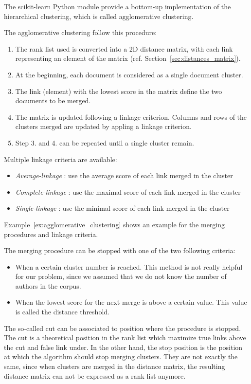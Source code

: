 The scikit-learn Python module \cite{sklearn} provide a bottom-up implementation of the hierarchical clustering, which is called agglomerative clustering.

The agglomerative clustering follow this procedure:
\begin{enumerate}
  \item The rank list used is converted into a 2D distance matrix, with each link representing an element of the matrix (ref. Section~\ref{sec:distances_matrix}).
  \item At the beginning, each document is considered as a single document cluster.
  \item The link (element) with the lowest score in the matrix define the two documents to be merged.
  \item The matrix is updated following a linkage criterion. Columns and rows of the clusters merged are updated by appling a linkage criterion.
  \item Step 3. and 4. can be repeated until a single cluster remain.
\end{enumerate}

Multiple linkage criteria are available:

\begin{itemize}
  \item
  \textit{Average-linkage} : use the average score of each link merged in the cluster
  \item
  \textit{Complete-linkage} : use the maximal score of each link merged in the cluster
  \item
  \textit{Single-linkage} : use the minimal score of each link merged in the cluster
\end{itemize}

Example~\ref{ex:agglomerative_clustering} shows an example for the merging procedures and linkage criteria.

The merging procedure can be stopped with one of the two following criteria:

\begin{itemize}
  \item
  When a certain cluster number is reached. This method is not really helpful for our problem, since we assumed that we do not know the number of authors in the corpus.
  \item
  When the lowest score for the next merge is above a certain value. This value is called the distance threshold.
\end{itemize}

The so-called cut can be associated to position where the procedure is stopped.
The cut is a theoretical position in the rank list which maximize true links above the cut and false link under.
In the other hand, the stop position is the position at which the algorithm should stop merging clusters.
They are not exactly the same, since when clusters are merged in the distance matrix, the resulting distance matrix can not be expressed as a rank list anymore.


